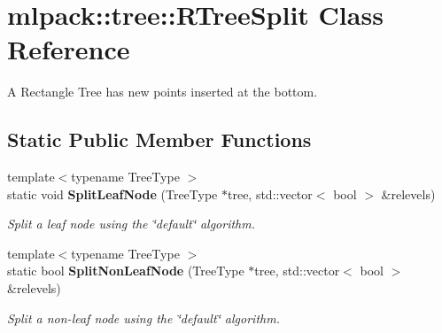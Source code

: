 \section{mlpack\+:\+:tree\+:\+:R\+Tree\+Split Class Reference}
\label{classmlpack_1_1tree_1_1RTreeSplit}


A Rectangle Tree has new points inserted at the bottom.  


\subsection*{Static Public Member Functions}
\begin{DoxyCompactItemize}
\item 
{\footnotesize template$<$typename Tree\+Type $>$ }\\static void {\bf Split\+Leaf\+Node} (Tree\+Type $\ast$tree, std\+::vector$<$ bool $>$ \&relevels)
\begin{DoxyCompactList}\small\item\em Split a leaf node using the \char`\"{}default\char`\"{} algorithm. \end{DoxyCompactList}\item 
{\footnotesize template$<$typename Tree\+Type $>$ }\\static bool {\bf Split\+Non\+Leaf\+Node} (Tree\+Type $\ast$tree, std\+::vector$<$ bool $>$ \&relevels)
\begin{DoxyCompactList}\small\item\em Split a non-\/leaf node using the \char`\"{}default\char`\"{} algorithm. \end{DoxyCompactList}\end{DoxyCompactItemize}
